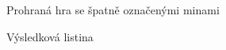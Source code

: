 \documentclass{article}
\begin{document}
\begin{appendices}
\begin{figure}[!h]
\begin{center}
    \caption{Prohraná hra se špatně označenými minami}
    \label{fig:loose}
\end{center}
\end{figure}

\begin{figure}[!h]
\begin{center}
    \caption{Výsledková listina}
    \label{fig:scoreboard}
\end{center}
\end{figure}

\end{appendices}
\end{document}
